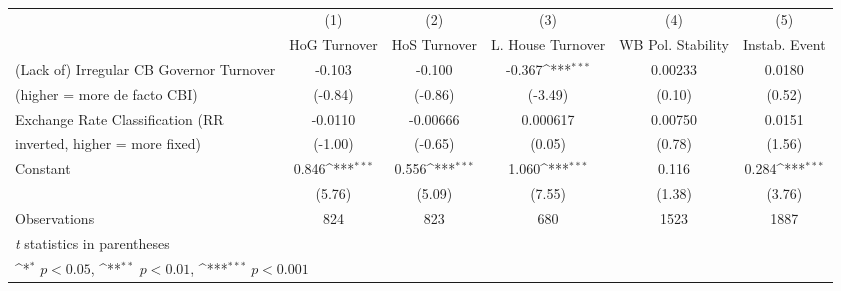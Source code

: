 \begin{table}[htbp]\centering
\def\sym#1{\ifmmode^{#1}\else\(^{#1}\)\fi}
\caption{\label{hkmultIndFEDF}}
\begin{tabular}{l*{5}{c}}
\toprule
                                        &\multicolumn{1}{c}{(1)}&\multicolumn{1}{c}{(2)}&\multicolumn{1}{c}{(3)}&\multicolumn{1}{c}{(4)}&\multicolumn{1}{c}{(5)}\\
                                        &\multicolumn{1}{c}{HoG Turnover}&\multicolumn{1}{c}{HoS Turnover}&\multicolumn{1}{c}{L. House Turnover}&\multicolumn{1}{c}{WB Pol. Stability}&\multicolumn{1}{c}{Instab. Event}\\
\midrule
(Lack of) Irregular CB Governor Turnover&   -0.103         &   -0.100         &   -0.367\sym{***}&  0.00233         &   0.0180         \\
(higher = more de facto CBI)            &  (-0.84)         &  (-0.86)         &  (-3.49)         &   (0.10)         &   (0.52)         \\
\addlinespace
Exchange Rate Classification (RR        &  -0.0110         & -0.00666         & 0.000617         &  0.00750         &   0.0151         \\
inverted, higher = more fixed)          &  (-1.00)         &  (-0.65)         &   (0.05)         &   (0.78)         &   (1.56)         \\
\addlinespace
Constant                                &    0.846\sym{***}&    0.556\sym{***}&    1.060\sym{***}&    0.116         &    0.284\sym{***}\\
                                        &   (5.76)         &   (5.09)         &   (7.55)         &   (1.38)         &   (3.76)         \\
\midrule
Observations                            &      824         &      823         &      680         &     1523         &     1887         \\
\bottomrule
\multicolumn{6}{l}{\footnotesize \textit{t} statistics in parentheses}\\
\multicolumn{6}{l}{\footnotesize \sym{*} \(p<0.05\), \sym{**} \(p<0.01\), \sym{***} \(p<0.001\)}\\
\end{tabular}
\end{table}
